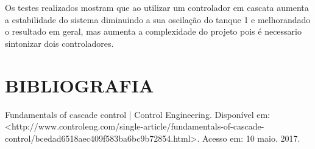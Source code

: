\documentclass[a4paper,12pt]{article}
\begin{document}
\hspace{4ex}Os testes realizados mostram que ao utilizar um controlador em cascata aumenta a estabilidade do sistema diminuindo a sua oscilação do tanque 1 e melhorandado o resultado em geral, mas aumenta a complexidade do projeto pois é necessario sintonizar dois controladores.



\thispagestyle{empty}
\section{BIBLIOGRAFIA}

Fundamentals of cascade control | Control Engineering. Disponível em: <http://www.controleng.com/single-article/fundamentals-of-cascade-control/bcedad6518aec409f583ba6bc9b72854.html>. Acesso em: 10 maio. 2017.





%


%
\end{document}
